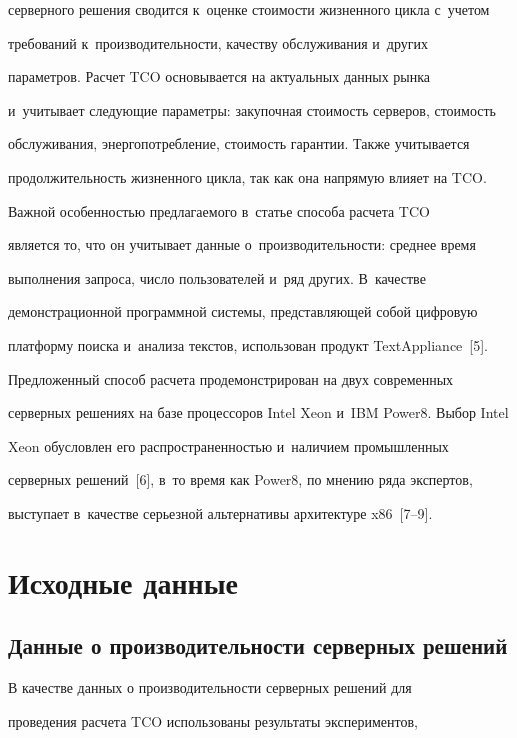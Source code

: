 серверного решения сводится к~оценке стоимости жизненного цик\-ла с~учетом 

требований к~производительности, качеству обслуживания и~других 

параметров. Расчет TCO основывается на актуальных данных рынка 

и~учитывает следующие параметры: закупочная сто\-и\-мость серверов, сто\-и\-мость 

обслуживания, энергопотребление, сто\-и\-мость гарантии. Также учитывается 

продолжительность жизненного цик\-ла, так как она напрямую влияет на TCO.

    

    Важной особенностью предлагаемого в~статье способа расчета TCO 

является то, что он учитывает данные о~производительности: среднее время 

выполнения запроса, чис\-ло пользователей и~ряд других. В~качестве 

демонстрационной программной системы, представляющей собой циф\-ро\-вую 

платформу поиска и~анализа текст\-ов, использован продукт TextAppliance~[5]. 

Предложенный способ расчета продемонстрирован на двух современных 

серверных решениях на базе процессоров Intel Xeon и~IBM Power8. Выбор Intel 

Xeon обусловлен его распространенностью и~наличием промышленных 

серверных решений~[6], в~то время как Power8, по мнению ряда экспертов, 

выступает в~качестве серьезной альтернативы архитектуре x86~[7--9].



\section{Исходные данные}

     

\subsection{Данные о производительности серверных решений}

     

  В качестве данных о производительности серверных решений для 

проведения расчета TCO использованы результаты экспериментов, 

